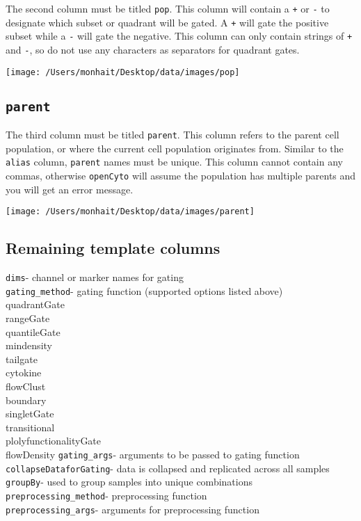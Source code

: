 \documentclass[]{book}
\begin{document}
The second column must be titled \texttt{pop}. This column will contain a \texttt{+} or \texttt{-} to designate which subset or quadrant will be gated. A \texttt{+} will gate the positive subset while a \texttt{-} will gate the negative. This column can only contain strings of \texttt{+} and \texttt{-}, so do not use any characters as separators for quadrant gates.

\texttt{[image: /Users/monhait/Desktop/data/images/pop]}

\hypertarget{parent}{%
\subsection{\texorpdfstring{\texttt{parent}}{parent}}\label{parent}}

The third column must be titled \texttt{parent}. This column refers to the parent cell population, or where the current cell population originates from. Similar to the \texttt{alias} column, \texttt{parent} names must be unique. This column cannot contain any commas, otherwise \texttt{openCyto} will assume the population has multiple parents and you will get an error message.

\texttt{[image: /Users/monhait/Desktop/data/images/parent]}

\hypertarget{remaining-template-columns}{%
\subsection{Remaining template columns}\label{remaining-template-columns}}

\texttt{dims}- channel or marker names for gating\\
\texttt{gating\_method}- gating function (supported options listed above)\\
quadrantGate\\
rangeGate\\
quantileGate\\
mindensity\\
tailgate\\
cytokine\\
flowClust\\
boundary\\
singletGate\\
transitional\\
plolyfunctionalityGate\\
flowDensity
\texttt{gating\_args}- arguments to be passed to gating function
\texttt{collapseDataforGating}- data is collapsed and replicated across all samples\\
\texttt{groupBy}- used to group samples into unique combinations\\
\texttt{preprocessing\_method}- preprocessing function\\
\texttt{preprocessing\_args}- arguments for preprocessing function
\end{document}
